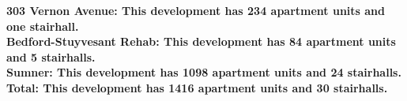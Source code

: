 \bf{303 Vernon Avenue}: This development has 234 apartment units and one stairhall.\\\bf{Bedford-Stuyvesant Rehab}: This development has 84 apartment units and 5 stairhalls.\\\bf{Sumner}: This development has 1098 apartment units and 24 stairhalls.\\\bf{Total}: This development has 1416 apartment units and 30 stairhalls.\\